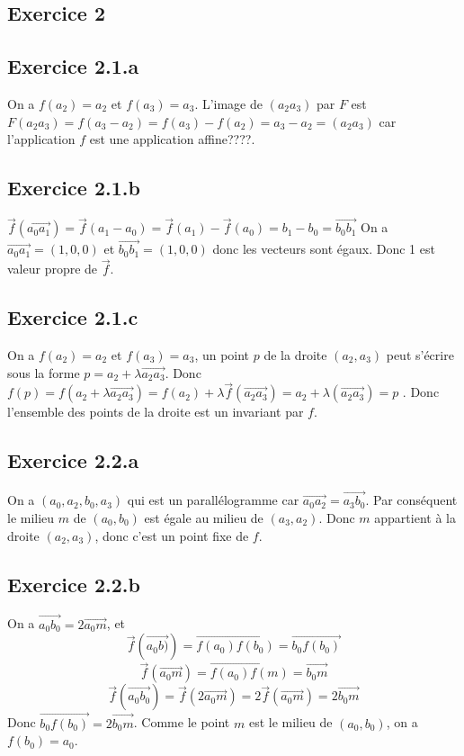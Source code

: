 \documentclass[]{book}
\theoremstyle{definition}
\newcommand{\vect}[1]{\overrightarrow{#1}}
\begin{document}
\subsection*{Exercice 2}
\subsection*{Exercice 2.1.a}
On a $f(a_2) = a_2$ et $f(a_3) = a_3$. L'image de $(a_2a_3)$ par $F$ est $F(a_2a_3) = f(a_3 - a_2) = f(a_3) - f(a_2) = a_3 - a_2 = (a_2a_3)$ car l'application $f$ est une application affine????.

\subsection*{Exercice 2.1.b}
$\vect{f}(\vect{a_0a_1}) = \vect{f}(a_1 - a_0) = \vect{f}(a_1) - \vect{f}(a_0) = b_1 - b_0 = \vect{b_0b_1}$
On a $\vect{a_0a_1} = (1,0,0)$ et $\vect{b_0b_1} = (1,0,0)$ donc les vecteurs sont \'egaux. Donc 1 est valeur propre de $\vect{f}$. 

\subsection*{Exercice 2.1.c}
On a $f(a_2) = a_2$ et $f(a_3) = a_3$, un point $p$ de la droite $(a_2, a_3)$ peut s'\'ecrire sous la forme $p = a_2 + \lambda \vect{a_2a_3}$. Donc $f(p) = f(a_2 + \lambda \vect{a_2a_3}) = f(a_2) + \lambda \vect{f}(\vect{a_2a_3}) = a_2 + \lambda (\vect{a_2a_3}) = p$ . Donc l'ensemble des points de la droite est un invariant par $f$.

\subsection*{Exercice 2.2.a}
On a $(a_0, a_2, b_0, a_3)$ qui est un parall\'elogramme car $\vect{a_0a_2} = \vect{a_3b_0}$. Par cons\'equent le milieu $m$ de $(a_0, b_0)$ est \'egale au milieu de $(a_3, a_2)$. Donc $m$ appartient \`a la droite $(a_2, a_3)$, donc c'est un point fixe de $f$.

\subsection*{Exercice 2.2.b}
On a $\vect{a_0b_0} = 2\vect{a_0m}$, et 
$$\vect{f}(\vect{a_0b)}) = \vect{f(a_0)f(b_0)} = \vect{b_0f(b_0)}$$
$$\vect{f}(\vect{a_0m}) = \vect{f(a_0)f(m)} = \vect{b_0m}$$
$$
\vect{f}(\vect{a_0b_0}) = \vect{f}(2\vect{a_0m}) = 2\vect{f}(\vect{a_0m}) = 2\vect{b_0m} 
$$
Donc $\vect{b_0f(b_0)} = 2\vect{b_0m}$. Comme le point $m$ est le milieu de $(a_0, b_0)$, on a $f(b_0) = a_0$.
\end{document}
